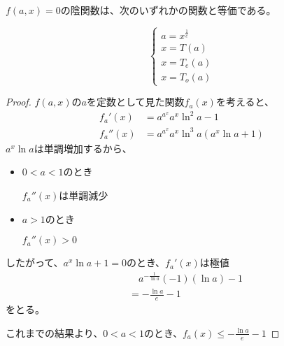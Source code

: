 	\begin{theorem}
		$f(a,x)=0$の陰関数は、次のいずれかの関数と等価である。
		
		\[
		\left \{
			\begin{array}{l}
				a = x^{\frac{1}{e}} \\
				x = T(a) \\
				x = T_e(a) \\
				x = T_o(a)
			\end{array}
		\right.
		\]
	\end{theorem}
	\begin{proof}
		$f(a,x)$の$a$を定数として見た関数$f_a(x)$を考えると、
		\begin{align*}
			f_a'(x) &= {a^{a^x}}{a^x}{\ln^2 a} - 1 \\
			f_a''(x)&= {a^{a^x}}{a^x}{\ln^3 a}(a^x\ln a + 1)
		\end{align*}
		$a^x\ln a$は単調増加するから、
		
		\begin{itemize}
			\item $0 < a < 1$のとき
			
				$f_a''(x)$は単調減少
			\item $a > 1$のとき
			
				$f_a''(x) > 0$
		\end{itemize}
		したがって、$a^x\ln a + 1 = 0$のとき、$f_a'(x)$は極値
		\begin{align*}
			& \quad a^{-\frac{1}{\ln a}}(-1)(\ln a) - 1 \\
			&=		-\frac{\ln a}{e} - 1
		\end{align*}
		をとる。
		
		これまでの結果より、$0 < a < 1$のとき、$f_a(x) \leq -\frac{\ln a}{e} - 1$
		
	\end{proof}
	